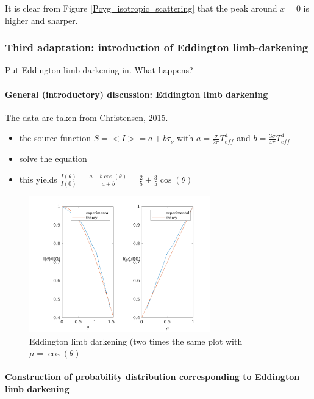\documentclass[../main/main.tex]{subfiles}
\begin{document}
It is clear from Figure \ref{Pcyg_isotropic_scattering} that the peak around $x=0$ is higher and sharper. \\
\noindent{}

\newpage
\subsubsection{Third adaptation: introduction of Eddington limb-darkening}
\label{Eddington limb darkening adaptation}
Put Eddington limb-darkening in. What happens? 

\paragraph{General (introductory) discussion: Eddington limb darkening}
The data are taken from Christensen, 2015.
\begin{itemize}
\item the source function $S= <I> = a + b\tau_{\nu}$ with $a= \frac{\sigma}{2 \pi}T_{eff}^4$ and $b = \frac{3 \sigma}{4 \pi}T_{eff}^4$
\item solve the equation
\item this yields $\frac{I(\theta)}{I(0)} = \frac{a+b\cos(\theta)}{a+b} = \frac{2}{5} + \frac{3}{5}\cos(\theta)$
\end{itemize}

\begin{figure}[!htp]
\centering
\includegraphics[width=0.7\textwidth]{../../introductory_exercises/P_Cygni_profile_UV_resonance/Eddington_limb_darkening.png}
\caption{Eddington limb darkening (two times the same plot with $\mu =  \cos(\theta)$ }
\end{figure}

\paragraph{Construction of probability distribution corresponding to Eddington limb darkening}
\end{document}

